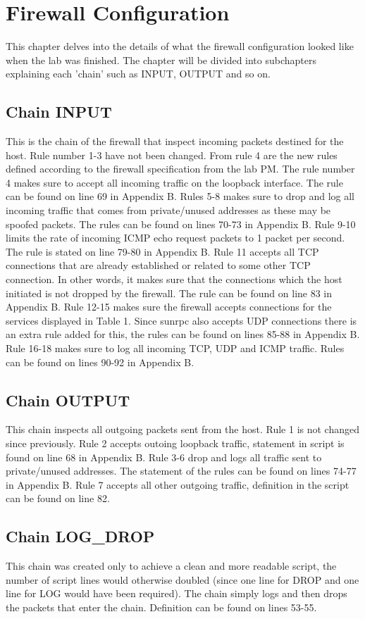 \section{Firewall Configuration}
\label{sec:config}
This chapter delves into the details of what the firewall configuration looked like when the lab was finished. The chapter will be divided into subchapters explaining each 'chain' such as INPUT, OUTPUT and so on.

\subsection{Chain INPUT}
This is the chain of the firewall that inspect incoming packets destined for the host. Rule number 1-3 have not been changed. From rule 4  are the new rules defined according to the firewall specification from the lab PM. The rule number 4 makes sure to accept all incoming traffic on the loopback interface. The rule can be found on line 69 in Appendix B. Rules 5-8 makes sure to drop and log all incoming traffic that comes from private/unused addresses as these may be spoofed packets. The rules can be found on lines 70-73 in Appendix B. Rule 9-10 limits the rate of incoming ICMP echo request packets to 1 packet per second. The rule is stated on line 79-80 in Appendix B. Rule 11 accepts all TCP connections that are already established or related to some other TCP connection. In other words, it makes sure that the connections which the host initiated is not dropped by the firewall. The rule can be found on line 83 in Appendix B. Rule 12-15 makes sure the firewall accepts connections for the services displayed in Table 1. Since sunrpc also accepts UDP connections there is an extra rule added for this, the rules can be found on lines 85-88 in Appendix B. Rule 16-18 makes sure to log all incoming TCP, UDP and ICMP traffic. Rules can be found on lines 90-92 in Appendix B.

\subsection{Chain OUTPUT}
This chain inspects all outgoing packets sent from the host. Rule 1 is not changed since previously. Rule 2 accepts outoing loopback traffic, statement in script is found on line 68 in Appendix B. Rule 3-6 drop and logs all traffic sent to private/unused addresses. The statement of the rules can be found on lines 74-77 in Appendix B. Rule 7 accepts all other outgoing traffic, definition in the script can be found on line 82.

\subsection{Chain LOG\_DROP}
This chain was created only to achieve a clean and more readable script, the number of script lines would otherwise doubled (since one line for DROP and one line for LOG would have been required). The chain simply logs and then drops the packets that enter the chain. Definition can be found on lines 53-55.


